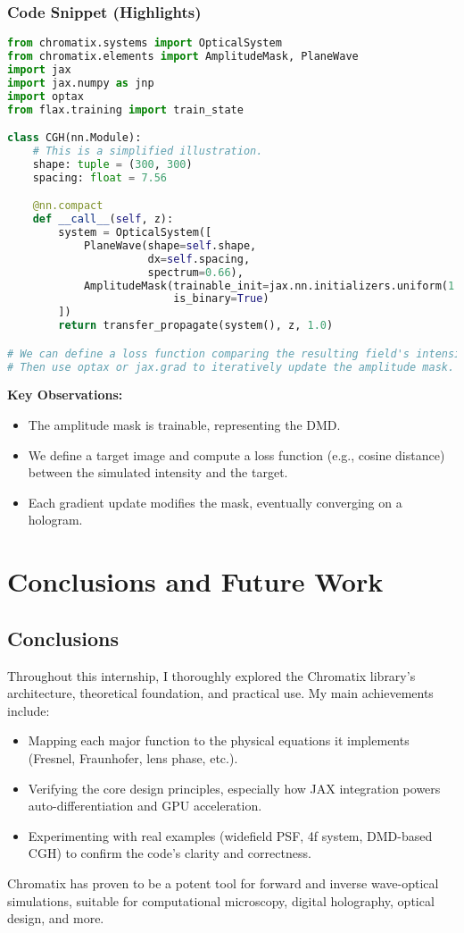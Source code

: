 \documentclass[a4paper,12pt]{report}
\begin{document}
\subsection{Code Snippet (Highlights)}
\begin{lstlisting}[language=Python]
from chromatix.systems import OpticalSystem
from chromatix.elements import AmplitudeMask, PlaneWave
import jax
import jax.numpy as jnp
import optax
from flax.training import train_state

class CGH(nn.Module):
    # This is a simplified illustration.
    shape: tuple = (300, 300)
    spacing: float = 7.56

    @nn.compact
    def __call__(self, z):
        system = OpticalSystem([
            PlaneWave(shape=self.shape,
                      dx=self.spacing,
                      spectrum=0.66),
            AmplitudeMask(trainable_init=jax.nn.initializers.uniform(1.5),
                          is_binary=True)
        ])
        return transfer_propagate(system(), z, 1.0)

# We can define a loss function comparing the resulting field's intensity to a target image.
# Then use optax or jax.grad to iteratively update the amplitude mask.
\end{lstlisting}
\noindent \textbf{Key Observations:}
\begin{itemize}
    \item The amplitude mask is trainable, representing the DMD.
    \item We define a target image and compute a loss function (e.g., cosine distance) between the simulated intensity and the target.
    \item Each gradient update modifies the mask, eventually converging on a hologram.
\end{itemize}

\chapter{Conclusions and Future Work}
\section{Conclusions}
Throughout this internship, I thoroughly explored the Chromatix library’s architecture, theoretical foundation, and practical use. My main achievements include:
\begin{itemize}
    \item Mapping each major function to the physical equations it implements (Fresnel, Fraunhofer, lens phase, etc.).
    \item Verifying the core design principles, especially how JAX integration powers auto-differentiation and GPU acceleration.
    \item Experimenting with real examples (widefield PSF, 4f system, DMD-based CGH) to confirm the code's clarity and correctness.
\end{itemize}
Chromatix has proven to be a potent tool for forward and inverse wave-optical simulations, suitable for computational microscopy, digital holography, optical design, and more.
\end{document}
